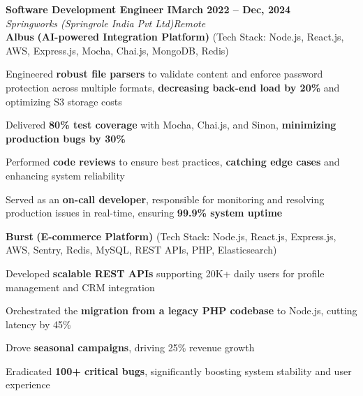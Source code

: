 \documentclass[letterpaper, 10pt]{article}
\newcommand{\heading}[2]{ \hspace{5pt}#1\hfill#2\\[1pt] }
\newcommand{\headingBf}[2]{ \heading{\textbf{#1}}{\textbf{#2}} }
\newcommand{\headingIt}[2]{ \heading{\textit{#1}}{\textit{#2}} }
\newenvironment{resume_list}{
\vspace{-3pt}
\begin{itemize}[itemsep=0.5pt, parsep=0.5pt, leftmargin=18pt] }{ \end{itemize}
\vspace{-3pt}
}
\begin{document}
\vspace{6pt}

\headingBf{Software Development Engineer I}{March 2022 -- Dec, 2024}
\headingIt{Springworks (Springrole India Pvt Ltd)}{Remote}
\vspace{5pt}
\hspace{10pt}\textbf{Albus} \textbf{(AI-powered Integration Platform)} \small{(Tech Stack: Node.js, React.js, AWS, Express.js, Mocha, Chai.js, MongoDB, Redis)}
\begin{resume_list}
    \item Engineered \textbf{robust file parsers} to validate content and enforce password protection across multiple formats, \textbf{decreasing back-end load by 20\%} and optimizing S3 storage costs 
    \item Delivered \textbf{80\% test coverage} with Mocha, Chai.js, and Sinon, \textbf{minimizing production bugs by 30\%}
    \item Performed \textbf{code reviews} to ensure best practices, \textbf{catching edge cases} and enhancing system reliability
    \item Served as an \textbf{on-call developer}, responsible for monitoring and resolving production issues in real-time, ensuring \textbf{99.9\% system uptime}
\end{resume_list}

\vspace{4pt}

\hspace{10pt}\textbf{Burst} \textbf{(E-commerce Platform)} \small{(Tech Stack: Node.js, React.js, Express.js, AWS, Sentry, Redis, MySQL, REST APIs, PHP, Elasticsearch)}
\begin{resume_list}
    \item Developed \textbf{scalable REST APIs} supporting 20K+ daily users for profile management and CRM integration
    \item Orchestrated the \textbf{migration from a legacy PHP codebase} to Node.js, cutting latency by 45\%
    \item Drove \textbf{seasonal campaigns}, driving 25\% revenue growth
    \item Eradicated \textbf{100+ critical bugs}, significantly boosting system stability and user experience
\end{resume_list}

\vspace{4pt}
\end{document}
